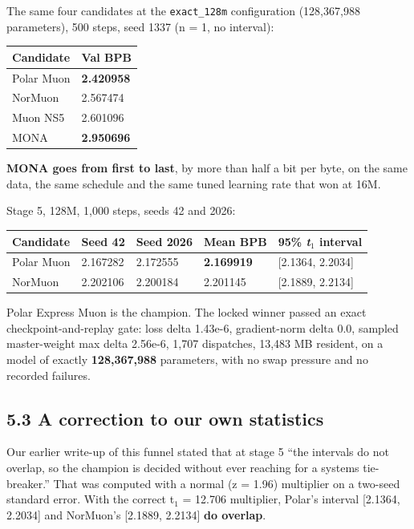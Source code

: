 The same four candidates at the \texttt{exact\_128m} configuration (128,367,988 parameters), 500 steps, seed 1337 (n = 1, no
interval):

{%
{\small\begin{longtable}[]{@{}ll@{}}
\toprule\noalign{}
Candidate & Val BPB \\
\midrule\noalign{}
\endhead
\bottomrule\noalign{}
\endlastfoot
Polar Muon & \textbf{2.420958} \\
NorMuon & 2.567474 \\
Muon NS5 & 2.601096 \\
MONA & \textbf{2.950696} \\
\end{longtable}}
}

\textbf{MONA goes from first to last}, by more than half a bit per byte, on the same data, the same
schedule and the same tuned learning rate that won at 16M.

Stage 5, 128M, 1,000 steps, seeds 42 and 2026:

{%
{\small\begin{longtable}[]{@{}lllll@{}}
\toprule\noalign{}
Candidate & Seed 42 & Seed 2026 & Mean BPB & 95\% \emph{t}$_1$ interval \\
\midrule\noalign{}
\endhead
\bottomrule\noalign{}
\endlastfoot
Polar Muon & 2.167282 & 2.172555 & \textbf{2.169919} & {[}2.1364, 2.2034{]} \\
NorMuon & 2.202106 & 2.200184 & 2.201145 & {[}2.1889, 2.2134{]} \\
\end{longtable}}
}

Polar Express Muon is the champion. The locked winner passed an exact checkpoint-and-replay gate:
loss delta 1.43e-6, gradient-norm delta 0.0, sampled master-weight max delta 2.56e-6, 1,707
dispatches, 13,483 MB resident, on a model of exactly \textbf{128,367,988} parameters, with no swap
pressure and no recorded failures.

\subsection{5.3 A correction to our own statistics}\label{a-correction-to-our-own-statistics}

Our earlier write-up of this funnel stated that at stage 5 ``the intervals do not overlap, so the
champion is decided without ever reaching for a systems tie-breaker.'' That was computed with a
normal (z = 1.96) multiplier on a two-seed standard error. With the correct t$_1$ = 12.706 multiplier,
Polar's interval {[}2.1364, 2.2034{]} and NorMuon's {[}2.1889, 2.2134{]} \textbf{do overlap}.

